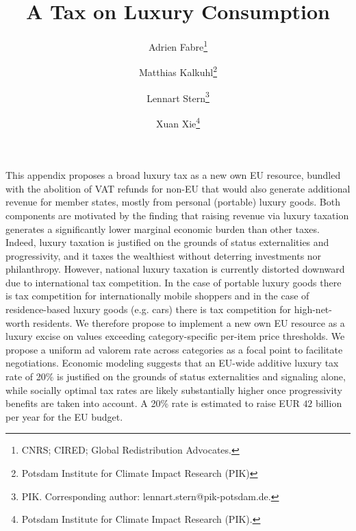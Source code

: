 \documentclass[../../main]{subfiles}
\begin{document}
\title{A Tax on Luxury Consumption} %
\author{Adrien Fabre\thanks{CNRS; CIRED; Global Redistribution Advocates.}\and Matthias Kalkuhl\thanks{Potsdam Institute for Climate Impact Research (PIK)}\and Lennart Stern\thanks{PIK. Corresponding author: lennart.stern@pik-potsdam.de.}\and Xuan Xie\thanks{Potsdam Institute for Climate Impact Research (PIK).}}


\maketitle

This appendix proposes a broad luxury tax as a new own EU resource, bundled with the abolition of VAT refunds for non-EU  that would also generate additional revenue for member states, mostly from personal (portable) luxury goods. %
Both components are motivated by the finding that raising revenue via luxury taxation generates a significantly lower marginal economic burden than other taxes.
Indeed, luxury taxation is justified on the grounds of status externalities and progressivity, and it taxes the wealthiest without deterring investments nor philanthropy. However, national luxury taxation is currently distorted downward due to international tax competition. In the case of portable luxury goods there is tax competition for internationally mobile shoppers and in the case of residence-based luxury goods (e.g. cars) there is tax competition for high-net-worth residents.
We therefore propose to implement a new own EU resource as a luxury excise on values exceeding category-specific per-item price thresholds. 
We propose a uniform ad valorem rate across categories as a focal point to facilitate negotiations. Economic modeling suggests that an EU-wide additive luxury tax rate of 20\% is justified on the grounds of status externalities and signaling alone, while socially optimal tax rates are likely substantially higher once progressivity benefits are taken into account. A 20\% rate is estimated to raise EUR $42$ billion per year for the EU budget. 
\end{document}
